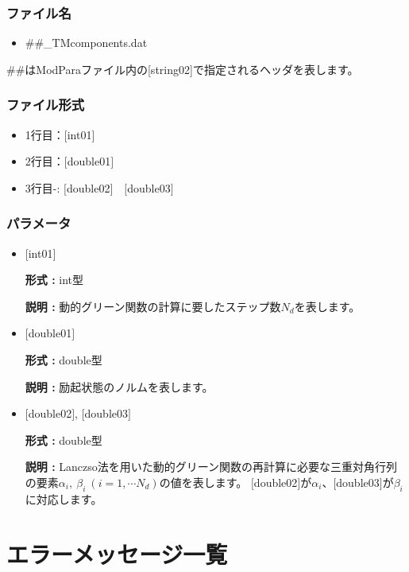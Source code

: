 \subsubsection{ファイル名}
\begin{itemize}
   \item{\#\#\_TMcomponents.dat}
\end{itemize}
  \#\#はModParaファイル内の[string02]で指定されるヘッダを表します。

\subsubsection{ファイル形式}
 \begin{itemize}
   \item  1行目：$[$int01$]$
   \item  2行目：$[$double01$]$
   \item  3行目-: $[$double02$]$~~$[$double03$]$
  \end{itemize}
\subsubsection{パラメータ}
 \begin{itemize}

  \item  $[$int01$]$

 {\bf 形式 :} int型

 {\bf 説明 :} 動的グリーン関数の計算に要したステップ数$N_d$を表します。

  \item  $[$double01$]$

 {\bf 形式 :} double型

{\bf 説明 :} 励起状態のノルムを表します。

 
 \item  $[$double02$]$, $[$double03$]$

 {\bf 形式 :} double型 

{\bf 説明 :} Lanczso法を用いた動的グリーン関数の再計算に必要な三重対角行列の要素$\alpha_i,~\beta_i~(i =1,\cdots N_d)$の値を表します。
$[$double02$]$が$\alpha_i$、$[$double03$]$が$\beta_i$に対応します。\\
\end{itemize}

\newpage
\section{エラーメッセージ一覧}

